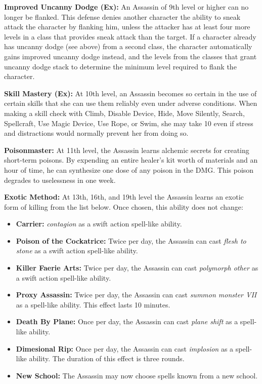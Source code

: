 \documentclass[10pt]{article}
\newcommand{\ability}[2]{\smallskip \noindent \textbf{#1} #2}
\newcommand{\spell}[1]{\emph{#1}}
\newcommand{\itemspace}[0]{\setlength{\itemsep}{-1mm}}
\begin{document}
\ability{Improved Uncanny Dodge (Ex):}{An Assassin of 9th level or higher can no longer be flanked. This defense denies another character the ability to sneak attack the character by flanking him, unless the attacker has at least four more levels in a class that provides sneak attack than the target. If a character already has uncanny dodge (see above) from a second class, the character automatically gains improved uncanny dodge instead, and the levels from the classes that grant uncanny dodge stack to determine the minimum level required to flank the character.}

\ability{Skill Mastery (Ex):}{At 10th level, an Assassin becomes so certain in the use of certain skills that she can use them reliably even under adverse conditions. When making a skill check with Climb, Disable Device, Hide, Move Silently, Search, Spellcraft, Use Magic Device, Use Rope, or Swim, she may take 10 even if stress and distractions would normally prevent her from doing so.}

\ability{Poisonmaster:}{At 11th level, the Assassin learns alchemic secrets for creating short-term poisons. By expending an entire healer's kit worth of materials and an hour of time, he can synthesize one dose of any poison in the DMG. This poison degrades to uselessness in one week.}

\ability{Exotic Method:}{At 13th, 16th, and 19th level the Assassin learns an exotic form of killing from the list below. Once chosen, this ability does not change:}
\begin{itemize}\itemspace

    \item \ability{Carrier:}{\spell{contagion} as a swift action spell-like ability.}
    \item \ability{Poison of the Cockatrice:}{Twice per day, the Assassin can cast \spell{flesh to stone} as a swift action spell-like ability.}
    \item \ability{Killer Faerie Arts:}{Twice per day, the Assassin can cast \spell{polymorph other} as a swift action spell-like ability.}
    \item \ability{Proxy Assassin:}{Twice per day, the Assassin can cast \spell{summon monster VII} as a spell-like ability. This effect lasts 10 minutes.}
    \item \ability{Death By Plane:}{Once per day, the Assassin can cast \spell{plane shift} as a spell-like ability.}
    \item \ability{Dimesional Rip:}{Once per day, the Assassin can cast \spell{implosion} as a spell-like ability. The duration of this effect is three rounds.}
    \item \ability{New School:}{The Assassin may now choose spells known from a new school.}
\end{itemize}
\end{document}
